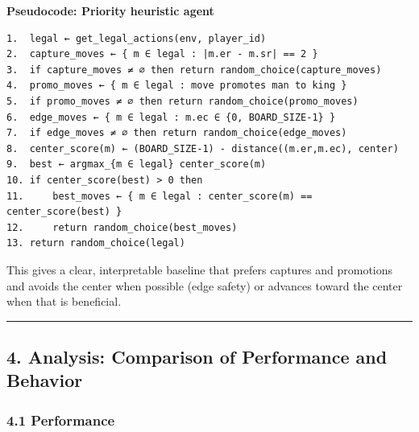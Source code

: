 \documentclass[
]{article}
\begin{document}
\textbf{Pseudocode: Priority heuristic agent}

\begin{verbatim}
1.  legal ← get_legal_actions(env, player_id)
2.  capture_moves ← { m ∈ legal : |m.er - m.sr| == 2 }
3.  if capture_moves ≠ ∅ then return random_choice(capture_moves)
4.  promo_moves ← { m ∈ legal : move promotes man to king }
5.  if promo_moves ≠ ∅ then return random_choice(promo_moves)
6.  edge_moves ← { m ∈ legal : m.ec ∈ {0, BOARD_SIZE-1} }
7.  if edge_moves ≠ ∅ then return random_choice(edge_moves)
8.  center_score(m) ← (BOARD_SIZE-1) - distance((m.er,m.ec), center)
9.  best ← argmax_{m ∈ legal} center_score(m)
10. if center_score(best) > 0 then
11.     best_moves ← { m ∈ legal : center_score(m) == center_score(best) }
12.     return random_choice(best_moves)
13. return random_choice(legal)
\end{verbatim}

This gives a clear, interpretable baseline that prefers captures and
promotions and avoids the center when possible (edge safety) or advances
toward the center when that is beneficial.

\begin{center}\rule{0.5\linewidth}{0.5pt}\end{center}

\subsection{4. Analysis: Comparison of Performance and
Behavior}\label{analysis-comparison-of-performance-and-behavior}

\subsubsection{4.1 Performance}\label{performance}
\end{document}

